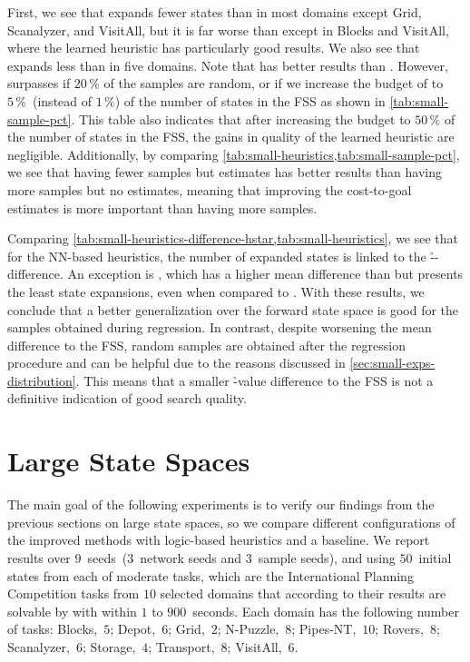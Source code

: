 First, we see that \hnnbase expands fewer states than \hgc in most domains except Grid, Scanalyzer, and VisitAll, but it is far worse than \hff except in Blocks and VisitAll, where the learned heuristic has particularly good results. We also see that \hnnl{\rlmeanfx} expands less than \hnnbase in five domains. Note that \hff has better results than \hnnl{\rlmeanfx}. However, \hnnl{\rlmeanfx} surpasses \hff if $20\,\%$ of the samples are random, or if we increase the budget of \hnnl{\rlmeanfx} to $5\,\%$~(instead of $1\,\%$) of the number of states in the FSS as shown in \cref{tab:small-sample-pct}. This table also indicates that after increasing the budget to $50\,\%$ of the number of states in the FSS, the gains in quality of the learned heuristic are negligible. Additionally, by comparing \cref{tab:small-heuristics,tab:small-sample-pct}, we see that having fewer samples but \hstar estimates has better results than having more samples but no \hstar estimates, meaning that improving the cost-to-goal estimates is more important than having more samples.

Comparing \cref{tab:small-heuristics-difference-hstar,tab:small-heuristics}, we see that for the NN-based heuristics, the number of expanded states is linked to the \h--\hstar difference. An exception is \hnnrs, which has a higher mean difference than \hnnl{\rlmeanfx} but presents the least state expansions, even when compared to \hff. With these results, we conclude that a better generalization over the forward state space is good for the samples obtained during regression. In contrast, despite worsening the mean difference to the FSS, random samples are obtained after the regression procedure and can be helpful due to the reasons discussed in \cref{sec:small-exps-distribution}. This means that a smaller \h-value difference to the FSS is not a definitive indication of good search quality.

\section{Large State Spaces}
\label{sec:large-experiments}

The main goal of the following experiments is to verify our findings from the previous sections on large state spaces, so we compare different configurations of the improved methods with logic-based heuristics and a baseline. We report results over $9$~seeds~($3$~network seeds and $3$~sample seeds), and using $50$~initial states from each of \citet{ferber2022neural} moderate tasks, which are the International Planning Competition tasks from $10$ selected domains that according to their results are solvable by \gbfs with \hff within $1$ to $900$~seconds. Each domain has the following number of tasks: Blocks,~$5$; Depot,~$6$; Grid,~$2$; N-Puzzle,~$8$; Pipes-NT,~$10$; Rovers,~$8$; Scanalyzer,~$6$; Storage,~$4$; Transport,~$8$; VisitAll,~$6$.

